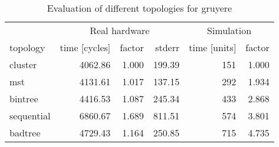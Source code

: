 \begin{table}[htb]
  \centering
  \begin{tabular}{lrrrrr}
  \toprule
  & \multicolumn{3}{c}{Real hardware} & \multicolumn{2}{c}{Simulation} \\
  topology & time [cycles] & factor & stderr & time [units] & factor \\
  \midrule
  cluster & 4062.86 & 1.000 & 199.39 & 151 & 1.000 \\
  mst & 4131.61 & 1.017 & 137.15 & 292 & 1.934 \\
  bintree & 4416.53 & 1.087 & 245.34 & 433 & 2.868 \\
  sequential & 6860.67 & 1.689 & 811.51 & 574 & 3.801 \\
  badtree & 4729.43 & 1.164 & 250.85 & 715 & 4.735 \\
  \midrule
  \end{tabular}
  \caption{Evaluation of different topologies for gruyere}
  \label{tab:gruyere}
\end{table}
